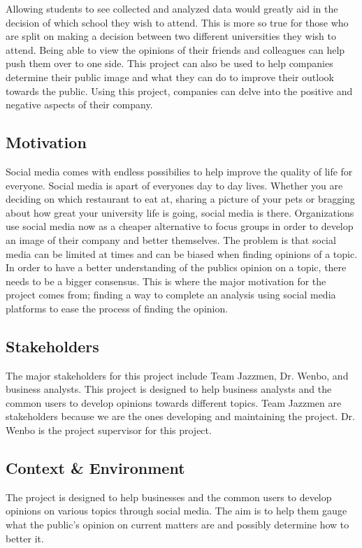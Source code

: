 \documentclass[12pt]{article}
\begin{document}
\noindent Allowing students to see collected and analyzed data would greatly aid in the decision of which school they wish to attend. This is more so true for those who are split on making a decision between two different universities they wish to attend. Being able to view the opinions of their friends and colleagues can help push them over to one side. This project can also be used to help companies determine their public image and what they can do to improve their outlook towards the public. Using this project, companies can delve into the positive and negative aspects of their company.\\

\subsection*{Motivation}
Social media comes with endless possibilies to help improve the quality of life for everyone. Social media is apart of everyones day to day lives. Whether you are deciding on which restaurant to eat at, sharing a picture of your pets or bragging about how great your university life is going, social media is there. Organizations use social media now as a cheaper alternative to focus groups in order to develop an image of their company and better themselves. The problem is that social media can be limited at times and can be biased  when finding opinions of a topic. In order to have a better understanding of the publics opinion on a topic, there needs to be a bigger consensus. This is where the major motivation for the project comes from; finding a way to complete an analysis using social media platforms to ease the process of finding the opinion.\\


\subsection*{Stakeholders}
The major stakeholders for this project include Team Jazzmen, Dr. Wenbo, and business analysts. This project is designed to help business analysts and the common users to develop opinions towards different topics. Team Jazzmen are stakeholders because we are the ones developing and maintaining the project. Dr. Wenbo is the project supervisor for this project.\\

\subsection*{Context \& Environment}
The project is designed to help businesses and the common users to develop opinions on various topics through social media. The aim is to help them gauge what the public's opinion on current matters are and possibly determine how to better it. \\
\end{document}
